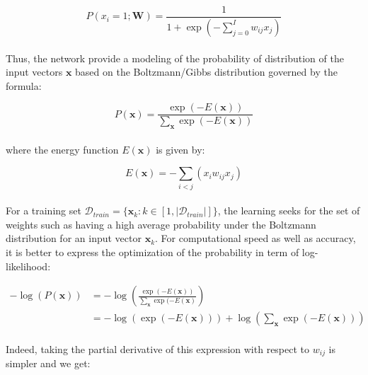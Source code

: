 \documentclass[a4paper,11pt]{report}
\begin{document}
		\begin{equation}
			P(x_{i} = 1; \mathbf{W}) = \frac{1}{1 + \exp(-\sum_{j=0}^{I}{w_{ij}x_{j}})}
		\end{equation}\\
    
		Thus, the network provide a modeling of the probability of distribution of the input vectors $\mathbf{x}$ based on the Boltzmann/Gibbs distribution governed by the formula:
    
		\begin{equation}
			P(\mathbf{x}) = \frac{\exp(-E(\mathbf{x}))}{\sum_{\mathbf{x}}{\exp(-E(\mathbf{x}))}}
		\end{equation}\\
    
		where the energy function $E(\mathbf{x})$ is given by:
    
		\begin{equation}
			E(\mathbf{x})= - \sum_{i<j}(x_{i}w_{ij}x_{j})
			\label{eq:BM_energy}
		\end{equation}\\
    
		For a training set $\mathcal{D}_{train} = \{\mathbf{x}_{k}: k\in \left[1,\left|\mathcal{D}_{train}\right| \right]\}$, the learning seeks for the set of weights such as having a high average probability under the Boltzmann distribution for an input vector $\mathbf{x}_{k}$. For computational speed as well as accuracy, it is better to express the optimization of the probability in term of log-likelihood:
    
		\begin{equation}
			\begin{split}
				- \log(P(\mathbf{x}))	&= - \log\left(\frac{\exp(-E(\mathbf{x}))}{\sum_{\mathbf{x}}{\exp(-E(\mathbf{x})}}\right) \\
															&= - \log(\exp(-E(\mathbf{x}))) + \log\left(\sum_{\mathbf{x}}{\exp(-E(\mathbf{x}))}\right)
			\end{split}
    \end{equation}\\
    
    Indeed, taking the partial derivative of this expression with respect to $w_{ij}$ is simpler and we get:
    
\end{document}
